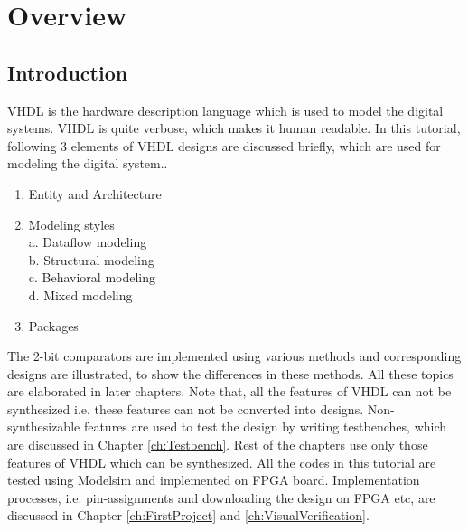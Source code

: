 \chapter{Overview} \label{ch:OverView}


\graphicspath{{Chapters/Overview/Figures/}}


%
%
%

\section{Introduction}
VHDL is the hardware description language which is used to model the digital systems. VHDL is quite verbose, which makes it human readable. In this tutorial, following 3 elements of VHDL designs are discussed briefly, which are used for modeling the digital system.. 
\begin{enumerate}
	\item Entity and Architecture
	\item Modeling styles\\
	a. Dataflow modeling\\
	b. Structural modeling\\
	c. Behavioral modeling\\
	d. Mixed modeling
	\item Packages
\end{enumerate}

The 2-bit comparators are implemented using various methods and corresponding designs are illustrated, to show the differences in these methods. All these topics are elaborated in later chapters. Note that, all the features of VHDL can not be synthesized i.e. these features can not be converted into designs. Non-synthesizable features are used to test the design by writing testbenches, which are discussed in Chapter \ref{ch:Testbench}. Rest of the chapters use only those features of VHDL which can be synthesized. All the codes in this tutorial are tested using Modelsim and implemented on FPGA board. Implementation processes, i.e. pin-assignments and downloading the design on FPGA etc, are discussed in Chapter \ref{ch:FirstProject} and \ref{ch:VisualVerification}.
%

